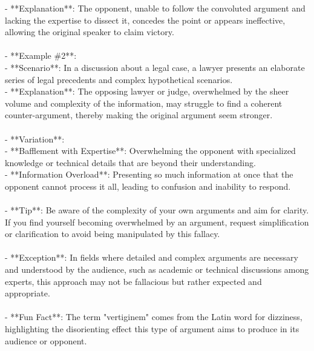 \documentclass[a4paper,12pt,single,pdftex]{scrbook}
\begin{document}
{    
        - **Explanation**: The opponent, unable to follow the convoluted argument and lacking the expertise to dissect it, concedes the point or appears ineffective, allowing the original speaker to claim victory.
    \\

    
      
    \\

    
      - **Example \#2**:
    \\

    
        - **Scenario**: In a discussion about a legal case, a lawyer presents an elaborate series of legal precedents and complex hypothetical scenarios.
    \\

    
        - **Explanation**: The opposing lawyer or judge, overwhelmed by the sheer volume and complexity of the information, may struggle to find a coherent counter-argument, thereby making the original argument seem stronger.
    \\

    
      
    \\

    
      - **Variation**:
    \\

    
        - **Bafflement with Expertise**: Overwhelming the opponent with specialized knowledge or technical details that are beyond their understanding.
    \\

    
        - **Information Overload**: Presenting so much information at once that the opponent cannot process it all, leading to confusion and inability to respond.
    \\

    
      
    \\

    
      - **Tip**: Be aware of the complexity of your own arguments and aim for clarity. If you find yourself becoming overwhelmed by an argument, request simplification or clarification to avoid being manipulated by this fallacy.
    \\

    
      
    \\

    
      - **Exception**: In fields where detailed and complex arguments are necessary and understood by the audience, such as academic or technical discussions among experts, this approach may not be fallacious but rather expected and appropriate.
    \\

    
      
    \\

    
      - **Fun Fact**: The term "vertiginem" comes from the Latin word for dizziness, highlighting the disorienting effect this type of argument aims to produce in its audience or opponent.
    \\

  }
\end{document}
